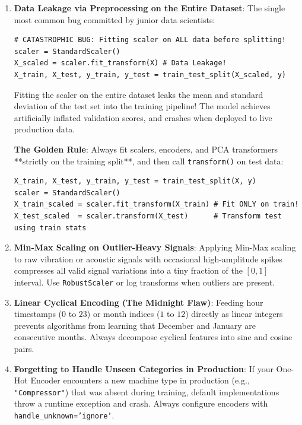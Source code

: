 \begin{warning}
\begin{enumerate}
    \item \textbf{Data Leakage via Preprocessing on the Entire Dataset}:
    The single most common bug committed by junior data scientists:
    \begin{lstlisting}[style=pythonstyle]
# CATASTROPHIC BUG: Fitting scaler on ALL data before splitting!
scaler = StandardScaler()
X_scaled = scaler.fit_transform(X) # Data Leakage!
X_train, X_test, y_train, y_test = train_test_split(X_scaled, y)
    \end{lstlisting}
    Fitting the scaler on the entire dataset leaks the mean and standard deviation of the test set into the training pipeline! The model achieves artificially inflated validation scores, and crashes when deployed to live production data.
    
    \textbf{The Golden Rule}: Always fit scalers, encoders, and PCA transformers **strictly on the training split**, and then call \texttt{transform()} on test data:
    \begin{lstlisting}[style=pythonstyle]
X_train, X_test, y_train, y_test = train_test_split(X, y)
scaler = StandardScaler()
X_train_scaled = scaler.fit_transform(X_train) # Fit ONLY on train!
X_test_scaled  = scaler.transform(X_test)      # Transform test using train stats
    \end{lstlisting}

    \item \textbf{Min-Max Scaling on Outlier-Heavy Signals}:
    Applying Min-Max scaling to raw vibration or acoustic signals with occasional high-amplitude spikes compresses all valid signal variations into a tiny fraction of the $[0, 1]$ interval. Use \texttt{RobustScaler} or log transforms when outliers are present.

    \item \textbf{Linear Cyclical Encoding (The Midnight Flaw)}:
    Feeding hour timestamps ($0$ to $23$) or month indices ($1$ to $12$) directly as linear integers prevents algorithms from learning that December and January are consecutive months. Always decompose cyclical features into sine and cosine pairs.

    \item \textbf{Forgetting to Handle Unseen Categories in Production}:
    If your One-Hot Encoder encounters a new machine type in production (e.g., \texttt{"Compressor"}) that was absent during training, default implementations throw a runtime exception and crash. 
    Always configure encoders with \texttt{handle\_unknown='ignore'}.
\end{enumerate}
\end{warning}

